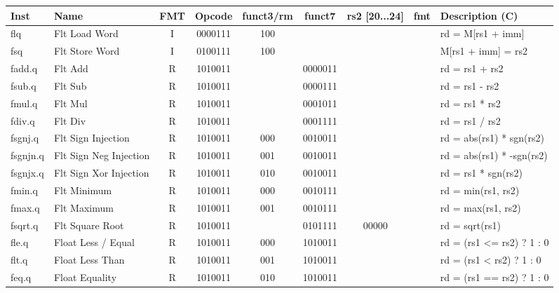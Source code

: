 \begin{center}
\begin{tabular}
{T | l | c | c | c | c | c | c | T } \hline
\rm Inst  & Name                  & FMT   & \rm Opcode & \rm funct3/rm & \rm funct7 & \rm rs2 [20...24] & \rm fmt & \rm Description (C)         \\ \hline
flq       & Flt Load Word         & I     & 0000111    & 100    &        &        & & rd = M[rs1 + imm]    \\
fsq       & Flt Store Word        & I     & 0100111    & 100    &        &        & & M[rs1 + imm] = rs2   \\
\hline
fadd.q    & Flt Add               & R     & 1010011    &        & 0000011 &        & & rd = rs1 + rs2       \\
fsub.q    & Flt Sub               & R     & 1010011    &        & 0000111 &        & & rd = rs1 - rs2       \\
fmul.q    & Flt Mul               & R     & 1010011    &        & 0001011 &        & & rd = rs1 * rs2       \\
fdiv.q    & Flt Div               & R     & 1010011    &        & 0001111 &        & & rd = rs1 / rs2       \\
fsgnj.q   & Flt Sign Injection    & R     & 1010011    & 000    & 0010011 &        & & rd = abs(rs1) * sgn(rs2) \\
fsgnjn.q  & Flt Sign Neg Injection& R     & 1010011    & 001    & 0010011 &        & & rd = abs(rs1) * -sgn(rs2) \\
fsgnjx.q  & Flt Sign Xor Injection& R     & 1010011    & 010    & 0010011 &        & & rd = rs1 * sgn(rs2)  \\
fmin.q    & Flt Minimum           & R     & 1010011    & 000    & 0010111 &        & & rd = min(rs1, rs2)   \\
fmax.q    & Flt Maximum           & R     & 1010011    & 001    & 0010111 &        & & rd = max(rs1, rs2)   \\
fsqrt.q   & Flt Square Root       & R     & 1010011    &        & 0101111 & 00000  & & rd = sqrt(rs1)       \\
\hline
fle.q     & Float Less / Equal    & R     & 1010011    & 000    & 1010011 &        & & rd = (rs1 <= rs2) ? 1 : 0\\
flt.q     & Float Less Than       & R     & 1010011    & 001    & 1010011 &        & & rd = (rs1 <  rs2) ? 1 : 0 \\
feq.q     & Float Equality        & R     & 1010011    & 010    & 1010011 &        & & rd = (rs1 == rs2) ? 1 : 0 \\

\end{tabular}
\end{center}
